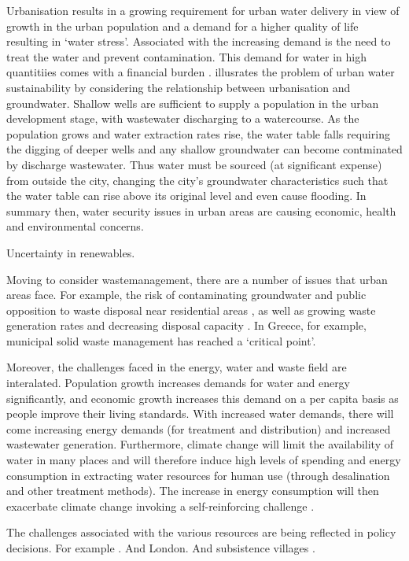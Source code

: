 Urbanisation results in a growing requirement for urban water delivery in view of growth in the urban population and a demand for a higher quality of life resulting in `water stress'. Associated with the increasing demand is the need to treat the water and prevent contamination. This demand for water in high quantitiies comes with a financial burden \citep{Diagger2009}. \citet{Kennedy} illusrates the problem of urban water sustainability by considering the relationship between urbanisation and groundwater. Shallow wells are sufficient to supply a population in the urban development stage, with wastewater discharging to a watercourse. As the population grows and water extraction rates rise, the water table falls requiring the digging of deeper wells and any shallow groundwater can become contminated by discharge wastewater. Thus water must be sourced (at significant expense) from outside the city, changing the city's groundwater characteristics such that the water table can rise above its original level and even cause flooding. In summary then, water security issues in urban areas are causing economic, health and environmental concerns.

\citep{Gabriel2005} Uncertainty in renewables.

Moving to consider wastemanagement, there are a number of issues that urban areas face. For example, the risk of contaminating groundwater and public opposition to waste disposal near residential areas \citep{Li2006}, as well as growing waste generation rates and decreasing disposal capacity \citep{Lu2009}. In Greece, for example, municipal solid waste management has reached a `critical point'.

Moreover, the challenges faced in the energy, water and waste field are interalated. Population growth increases demands for water and energy significantly, and economic growth increases this demand on a per capita basis as people improve their living standards. With increased water demands, there will come increasing energy demands (for treatment and distribution) and increased wastewater generation. Furthermore, climate change will limit the availability of water in many places and will therefore induce high levels of spending and energy consumption in extracting water resources for human use (through desalination and other treatment methods). The increase in energy consumption will then exacerbate climate change invoking a self-reinforcing challenge \citet{Webber2011}.

The challenges associated with the various resources are being reflected in policy decisions. For example \citet{Clift2000}. And London. And subsistence villages \citep{Haberl2003}.

